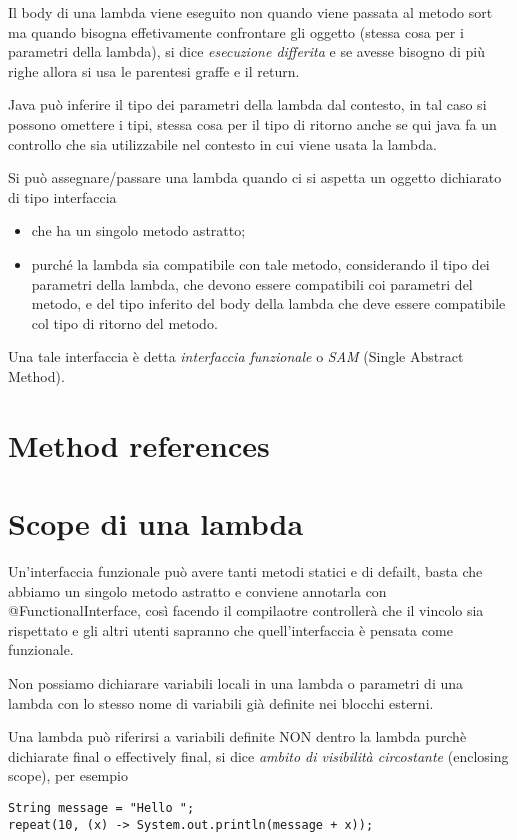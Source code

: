 Il body di una lambda viene eseguito non quando viene passata al metodo sort ma quando bisogna effetivamente confrontare gli oggetto (stessa cosa per i parametri 
della lambda), si dice \textit{esecuzione differita} e se avesse bisogno di più righe allora si usa le parentesi graffe e il return.

Java può inferire il tipo dei parametri della lambda dal contesto, in tal caso si possono omettere i tipi, stessa cosa per il tipo di ritorno anche se qui java fa un 
controllo che sia utilizzabile nel contesto in cui viene usata la lambda.

Si può assegnare/passare una lambda quando ci si aspetta un oggetto dichiarato di tipo interfaccia
\begin{itemize}
    \item che ha un singolo metodo astratto;
    \item purché la lambda sia compatibile con tale metodo, considerando il tipo dei parametri della lambda, che devono essere compatibili coi parametri del metodo, 
    e del tipo inferito del body della lambda che deve essere compatibile col tipo di ritorno del metodo.
\end{itemize}

Una tale interfaccia è detta \textit{interfaccia funzionale} o \textit{SAM} (Single Abstract Method).

\section{Method references}


\section{Scope di una lambda}
Un'interfaccia funzionale può avere tanti metodi statici e di defailt, basta che abbiamo un singolo metodo astratto e conviene annotarla con @FunctionalInterface, così
facendo il compilaotre controllerà che il vincolo sia rispettato e gli altri utenti sapranno che quell'interfaccia è pensata come funzionale.

Non possiamo dichiarare variabili locali in una lambda o parametri di una lambda con lo stesso nome di variabili già definite nei blocchi esterni. 

Una lambda può riferirsi a variabili definite NON dentro la lambda purchè dichiarate final o effectively final, si dice \textit{ambito di visibilità circostante} 
(enclosing scope), per esempio
\begin{lstlisting}
String message = "Hello ";
repeat(10, (x) -> System.out.println(message + x));
\end{lstlisting}

